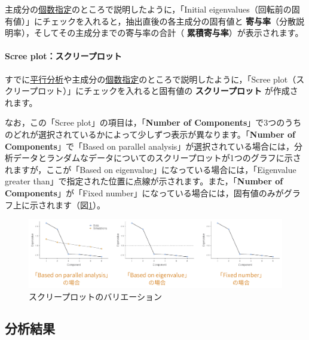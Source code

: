 \documentclass[
  12pt,
  a5jpaper,
  lualatex, ja=standard]{bxjsbook}
\renewcommand{\emph}[1]{\textbf{\color{emph} #1}}
\begin{document}
主成分の\protect\hyperlink{subsub:factor-pca-fixednumber}{個数指定}のところで説明したように，「Initial eigenvalues（回転前の固有値）」にチェックを入れると，抽出直後の各主成分の固有値と\emph{寄与率}（分散説明率），そしてその主成分までの寄与率の合計（\emph{累積寄与率}）が表示されます。

\hypertarget{scree-plotux30b9ux30afux30eaux30fcux30d7ux30edux30c3ux30c8}{%
\paragraph*{Scree plot：スクリープロット}\label{scree-plotux30b9ux30afux30eaux30fcux30d7ux30edux30c3ux30c8}}

すでに\protect\hyperlink{subsub:factor-pca-component-parallel}{平行分析}や主成分の\protect\hyperlink{subsub:factor-pca-fixednumber}{個数指定}のところで説明したように，「Scree plot（スクリープロット）」にチェックを入れると固有値の\emph{スクリープロット}
が作成されます。

なお，この「Scree plot」の項目は，「\textbf{Number of Components}」で3つのうちのどれが選択されているかによって少しずつ表示が異なります。「\textbf{Number of Components}」で「Based on parallel analysis」が選択されている場合には，分析データとランダムなデータについてのスクリープロットが1つのグラフに示されますが，ここが「Based on eigenvalue」になっている場合には，「Eigenvalue greater than」で指定された位置に点線が示されます。また，「\textbf{Number of Components}」が「Fixed number」になっている場合には，固有値のみがグラフ上に示されます（図\ref{fig:factor-pca-scree-plots}）。

\begin{figure}[!ht]

{\centering \includegraphics[width=1\linewidth]{images/factor/pca-scree-plots} 

}

\caption{スクリープロットのバリエーション}\label{fig:factor-pca-scree-plots}
\end{figure}

\hypertarget{sub:factor-pca-results}{%
\subsection{分析結果}\label{sub:factor-pca-results}}
\end{document}
